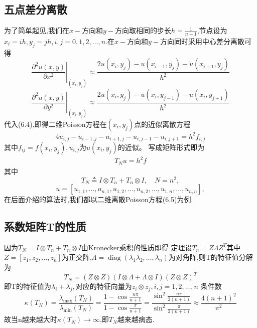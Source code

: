 \documentclass[12pt,a4paper]{article}
\begin{document}
\subsection*{ 五点差分离散}
为了简单起见,我们在$x-$方向和$y-$方向取相同的步长$h=\frac{1}{n+1}$,节点设为
$x_{i}=i h, y_{j}=j h, i, j=0,1,2, \ldots, n.$在$x-$方向和$y-$方向同时采用中心差分离散可得
$$
\left.\frac{\partial^{2} u(x, y)}{\partial x^{2}}\right|_{\left(x_{i}, y_{j}\right)} \approx \frac{2 u\left(x_{i}, y_{j}\right)-u\left(x_{i-1}, y_{j}\right)-u\left(x_{i+1}, y_{j}\right)}{h^{2}}
$$
$$
\left.\frac{\partial^{2} u(x, y)}{\partial y^{2}}\right|_{\left(x_{i}, y_{j}\right)} \approx \frac{2 u\left(x_{i}, y_{j}\right)-u\left(x_{i}, y_{j-1}\right)-u\left(x_{i}, y_{j+1}\right)}{h^{2}}
$$
代入({\color{blue}6.4}),即得二维Poisson方程在$(x_i, y_j)$点的近似离散方程
$$
\boxed {4 u_{i, j}-u_{i-1, j}-u_{i+1, j}-u_{i, j-1}-u_{i, j+1}=h^{2} f_{i, j}}
$$  
其中$f_{i j}=f\left(x_{i}, y_{j}\right), u_{i, j}$为$u\left(x_{i}, y_{j}\right)$的近似。
写成矩阵形式即为
\begin{align}
T_{N} u=h^{2} f
\tag{6.5}
\end{align}
其中
$$
T_{N} \triangleq I \otimes T_{n}+T_{n} \otimes I, \quad N=n^{2},
$$
$$
u=\left[u_{1,1}, \ldots, u_{n, 1}, u_{1,2}, \ldots, u_{n, 2}, \ldots, u_{1, n}, \ldots, u_{n, n}\right],
$$
在后面介绍的算法时,我们都以二维离散Poisson方程({\color{blue}6.5})为例.

\subsection*{ 系数矩阵T的性质}
因为$T_{N}=I \otimes T_{n}+T_{n} \otimes I$由Kronecker乘积的性质即得
{\color{blue}定理}\quad 设$T_{n}=Z \Lambda Z^{T}$其中$Z=\left[z_{1}, z_{2}, \ldots, z_{n}\right]$为正交阵,$\Lambda=\operatorname{diag}\left(\lambda_{1}\lambda_{2}, \dots, \lambda_{n} \right)$为对角阵,则T的特征值分解为
$$
T_{N}=(Z \otimes Z)(I \otimes \Lambda+\Lambda \otimes I)(Z \otimes Z)^{T}
$$
即T的特征值为$\lambda_{i}+\lambda_{j},$对应的特征向量为$ z_{i} \otimes z_{j}, i, j=1,2, \dots, n$
条件数
$$
\kappa\left(T_{N}\right)=\frac{\lambda_{\max }\left(T_{N}\right)}{\lambda_{\min }\left(T_{N}\right)}=\frac{1-\cos \frac{n \pi}{n+1}}{1-\cos \frac{\pi}{n+1}}=\frac{\sin ^{2} \frac{n \pi}{2(n+1)}}{\sin ^{2} \frac{\pi}{2(n+1)}} \approx \frac{4(n+1)^{2}}{\pi^{2}}
$$
故当n越来越大时$\kappa\left(T_{N}\right) \rightarrow \infty$,即$T_N$越来越病态.
\newpage
\end{document}
